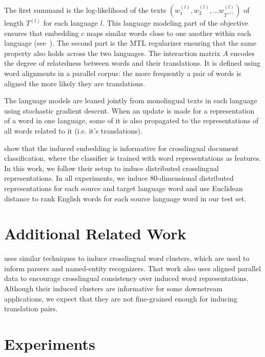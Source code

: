 \documentclass[11pt]{article}
\begin{document}
The first summand is the log-likelihood of the texts $(w_1^{(l)}, w_2^{(l)}, \dots w_{T^{(l)}}^{(l)})$ of length $T^{(l)}$ for each language $l$.  This language modeling part of the objective ensures that embedding $c$ maps similar words close to one another within each language (see~).  The second part is the MTL regularizer ensuring that the same property also holds across the two languages.  
The interaction matrix $A$ encodes the degree of relatedness between words and their translations.   
It is defined using word alignments in a parallel corpus: the more frequently a pair of words is aligned the more likely they are translations.

The language models are leaned jointly from monolingual texts in each language using stochastic gradient descent.  When an update is made for a representation of a word in one language, some of it is also propagated to the representations of all words related to it (i.e. it's translations).

 show that the induced embedding is informative for crosslingual document classification, where the classifier is trained with word representations as features.
In this work, we follow their setup to induce distributed crosslingual representations. %
In all experiments, we induce 80-dimensional distributed representations for each source and target language word and use Euclidean distance to rank English words for each source language word in our test set.


\section{Additional Related Work} \label{sect:rework}

 uses similar techniques to induce crosslingual word clusters, which are used to inform parsers and named-entity recognizers. 
That work also uses aligned parallel data to encourage crosslingual consistency over induced word representations.
Although their induced clusters are informative for some downstream applications, we expect that they are not fine-grained enough for inducing translation pairs.

\section{Experiments} \label{sect:experiments}
\end{document}
